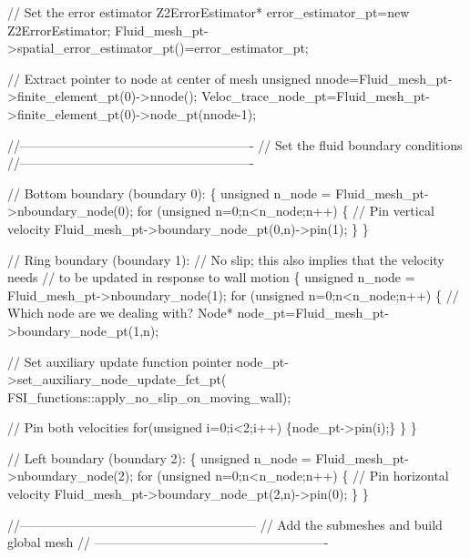 \begin{DoxyCodeInclude}
{ \textcolor{comment}{// Set the error estimator}
 Z2ErrorEstimator* error\_estimator\_pt=\textcolor{keyword}{new} Z2ErrorEstimator;
 Fluid\_mesh\_pt->spatial\_error\_estimator\_pt()=error\_estimator\_pt;
  
 \textcolor{comment}{// Extract pointer to node at center of mesh}
 \textcolor{keywordtype}{unsigned} nnode=Fluid\_mesh\_pt->finite\_element\_pt(0)->nnode();
 Veloc\_trace\_node\_pt=Fluid\_mesh\_pt->finite\_element\_pt(0)->node\_pt(nnode-1);
 
 \textcolor{comment}{//-------------------------------------------------------}
 \textcolor{comment}{// Set the fluid boundary conditions}
 \textcolor{comment}{//-------------------------------------------------------}

 \textcolor{comment}{// Bottom boundary (boundary 0): }
 \{
  \textcolor{keywordtype}{unsigned} n\_node = Fluid\_mesh\_pt->nboundary\_node(0);
  \textcolor{keywordflow}{for} (\textcolor{keywordtype}{unsigned} n=0;n<n\_node;n++)
   \{
    \textcolor{comment}{// Pin vertical velocity}
    Fluid\_mesh\_pt->boundary\_node\_pt(0,n)->pin(1);
   \}
 \}
            
 \textcolor{comment}{// Ring boundary (boundary 1): }
 \textcolor{comment}{// No slip; this also implies that the velocity needs}
 \textcolor{comment}{// to be updated in response to wall motion}
 \{
  \textcolor{keywordtype}{unsigned} n\_node = Fluid\_mesh\_pt->nboundary\_node(1);
  \textcolor{keywordflow}{for} (\textcolor{keywordtype}{unsigned} n=0;n<n\_node;n++)
   \{
    \textcolor{comment}{// Which node are we dealing with?}
    Node* node\_pt=Fluid\_mesh\_pt->boundary\_node\_pt(1,n);

     \textcolor{comment}{// Set auxiliary update function pointer}
    node\_pt->set\_auxiliary\_node\_update\_fct\_pt(
     FSI\_functions::apply\_no\_slip\_on\_moving\_wall);
    
    \textcolor{comment}{// Pin both velocities}
    \textcolor{keywordflow}{for}(\textcolor{keywordtype}{unsigned} i=0;i<2;i++) \{node\_pt->pin(i);\}
   \}
 \}

 \textcolor{comment}{// Left boundary (boundary 2):}
  \{
   \textcolor{keywordtype}{unsigned} n\_node = Fluid\_mesh\_pt->nboundary\_node(2);
   \textcolor{keywordflow}{for} (\textcolor{keywordtype}{unsigned} n=0;n<n\_node;n++)
    \{
     \textcolor{comment}{// Pin horizontal velocity}
       Fluid\_mesh\_pt->boundary\_node\_pt(2,n)->pin(0);
    \}
  \}


 \textcolor{comment}{//--------------------------------------------------------}
 \textcolor{comment}{// Add the submeshes and build global mesh}
 \textcolor{comment}{// -------------------------------------------------------}

}
\end{DoxyCodeInclude}
